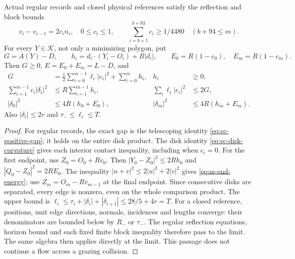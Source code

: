 \begin{lemma}
\label{lem:ss-closed-gap}
Actual regular records and closed physical references satisfy the
reflection and block bounds
\begin{equation}\label{eq:ss-closed-reflection}
 v_i-v_{i-1}=2c_i n_i,\quad 0\le c_i\le1,\qquad
 \sum_{i=b+1}^{b+93}c_i\ge1/4480\quad(b+94\le m).
\end{equation}
For every $Y\in\mathcal K$, not only a minimizing polygon, put
\[
 G=A(Y)-D,\qquad
 h_i=d_i\cdot(Y_i-O_i)+R|d_i|,\qquad
 E_0=R(1-c_0),\quad E_m=R(1-c_m).
\]
Then $G\ge0$, $E=E_0+E_m=L-D$, and
\begin{align}
 G&=\tfrac12\sum_{i=0}^{m-1}\ell_i|e_i|^2+\sum_{i=0}^m h_i,
 &h_i&\ge0,\label{eq:ss-exact-gap}\\
 \sum_{i=1}^{m-1}c_i|\delta_i|^2&\le R\sum_{i=1}^{m-1}h_i,
 &\sum_i\ell_i|e_i|^2&\le2G,\label{eq:ss-energy}\\
 |\delta_0|^2&\le4R(h_0+E_0),
 &|\delta_m|^2&\le4R(h_m+E_m).\label{eq:ss-end-energy}
\end{align}
Also $|\delta_i|\le2r$ and $\tau_-\le\ell_i\le T$.
\end{lemma}
\begin{proof}
For regular records, the exact gap is the telescoping identity
\eqref{eq:sc-positive-gap}; it holds on the entire disk product.
The disk identity \eqref{eq:sc-disk-curvature} gives each interior
contact inequality, including when $c_i=0$. For the first endpoint,
use $Z_0=O_0+Rv_0$. Then
$|Y_0-Z_0|^2\le2Rh_0$ and $|Q_0-Z_0|^2=2RE_0$.
The inequality $|u+v|^2\le2|u|^2+2|v|^2$ gives
\eqref{eq:ss-end-energy}; use $Z_m=O_m-Rv_{m-1}$ at the final
endpoint. Since consecutive disks are separated, every edge is
nonzero, even on the whole comparison product. The upper bound is
$\ell_i\le\tau_i+|\delta_i|+|\delta_{i+1}|\le28/5+4r=T$.
For a closed reference, positions, unit edge directions, normals,
incidences and lengths converge: their denominators are bounded below
by $R_-$ or $\tau_-$. The regular reflection equations, horizon bound
and each fixed finite block inequality therefore pass to the limit.
The same algebra then applies directly at the limit. This passage does
not continue a flow across a grazing collision.
\end{proof}

